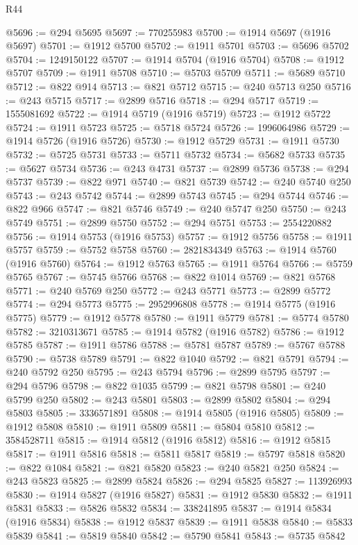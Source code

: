 \begin{lexlean}{R44}
\begin{coremodule}
{@5696 := @294 @5695
@5697 := 770255983
@5700 := @1914 @5697 (@1916 @5697)
@5701 := @1912 @5700
@5702 := @1911 @5701
@5703 := @5696 @5702
@5704 := 1249150122
@5707 := @1914 @5704 (@1916 @5704)
@5708 := @1912 @5707
@5709 := @1911 @5708
@5710 := @5703 @5709
@5711 := @5689 @5710
@5712 := @822 @914
@5713 := @821 @5712
@5715 := @240 @5713 @250
@5716 := @243 @5715
@5717 := @2899 @5716
@5718 := @294 @5717
@5719 := 1555081692
@5722 := @1914 @5719 (@1916 @5719)
@5723 := @1912 @5722
@5724 := @1911 @5723
@5725 := @5718 @5724
@5726 := 1996064986
@5729 := @1914 @5726 (@1916 @5726)
@5730 := @1912 @5729
@5731 := @1911 @5730
@5732 := @5725 @5731
@5733 := @5711 @5732
@5734 := @5682 @5733
@5735 := @5627 @5734
@5736 := @243 @4731
@5737 := @2899 @5736
@5738 := @294 @5737
@5739 := @822 @971
@5740 := @821 @5739
@5742 := @240 @5740 @250
@5743 := @243 @5742
@5744 := @2899 @5743
@5745 := @294 @5744
@5746 := @822 @966
@5747 := @821 @5746
@5749 := @240 @5747 @250
@5750 := @243 @5749
@5751 := @2899 @5750
@5752 := @294 @5751
@5753 := 2554220882
@5756 := @1914 @5753 (@1916 @5753)
@5757 := @1912 @5756
@5758 := @1911 @5757
@5759 := @5752 @5758
@5760 := 2821834349
@5763 := @1914 @5760 (@1916 @5760)
@5764 := @1912 @5763
@5765 := @1911 @5764
@5766 := @5759 @5765
@5767 := @5745 @5766
@5768 := @822 @1014
@5769 := @821 @5768
@5771 := @240 @5769 @250
@5772 := @243 @5771
@5773 := @2899 @5772
@5774 := @294 @5773
@5775 := 2952996808
@5778 := @1914 @5775 (@1916 @5775)
@5779 := @1912 @5778
@5780 := @1911 @5779
@5781 := @5774 @5780
@5782 := 3210313671
@5785 := @1914 @5782 (@1916 @5782)
@5786 := @1912 @5785
@5787 := @1911 @5786
@5788 := @5781 @5787
@5789 := @5767 @5788
@5790 := @5738 @5789
@5791 := @822 @1040
@5792 := @821 @5791
@5794 := @240 @5792 @250
@5795 := @243 @5794
@5796 := @2899 @5795
@5797 := @294 @5796
@5798 := @822 @1035
@5799 := @821 @5798
@5801 := @240 @5799 @250
@5802 := @243 @5801
@5803 := @2899 @5802
@5804 := @294 @5803
@5805 := 3336571891
@5808 := @1914 @5805 (@1916 @5805)
@5809 := @1912 @5808
@5810 := @1911 @5809
@5811 := @5804 @5810
@5812 := 3584528711
@5815 := @1914 @5812 (@1916 @5812)
@5816 := @1912 @5815
@5817 := @1911 @5816
@5818 := @5811 @5817
@5819 := @5797 @5818
@5820 := @822 @1084
@5821 := @821 @5820
@5823 := @240 @5821 @250
@5824 := @243 @5823
@5825 := @2899 @5824
@5826 := @294 @5825
@5827 := 113926993
@5830 := @1914 @5827 (@1916 @5827)
@5831 := @1912 @5830
@5832 := @1911 @5831
@5833 := @5826 @5832
@5834 := 338241895
@5837 := @1914 @5834 (@1916 @5834)
@5838 := @1912 @5837
@5839 := @1911 @5838
@5840 := @5833 @5839
@5841 := @5819 @5840
@5842 := @5790 @5841
@5843 := @5735 @5842
}
\end{coremodule}
\end{lexlean}
